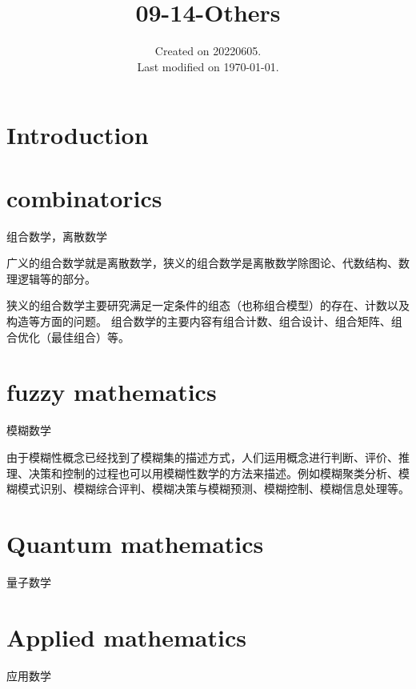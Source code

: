 \documentclass[UTF8]{../09-Mathematics}
\begin{document}
\title{09-14-Others}
\date{Created on 20220605.\\   Last modified on \today.}
\maketitle
\tableofcontents


\chapter{Introduction}




\chapter{combinatorics}
组合数学，离散数学

广义的组合数学就是离散数学，狭义的组合数学是离散数学除图论、代数结构、数理逻辑等的部分。

狭义的组合数学主要研究满足一定条件的组态（也称组合模型）的存在、计数以及构造等方面的问题。 组合数学的主要内容有组合计数、组合设计、组合矩阵、组合优化（最佳组合）等。

\chapter{fuzzy mathematics}
模糊数学

由于模糊性概念已经找到了模糊集的描述方式，人们运用概念进行判断、评价、推理、决策和控制的过程也可以用模糊性数学的方法来描述。例如模糊聚类分析、模糊模式识别、模糊综合评判、模糊决策与模糊预测、模糊控制、模糊信息处理等。

\chapter{Quantum mathematics}

量子数学


\chapter{Applied mathematics}
应用数学
\end{document}
